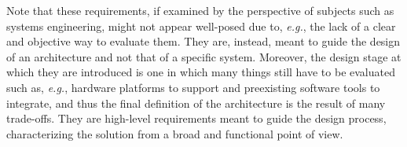 Note that these requirements, if examined by the perspective of subjects such as systems engineering, might not appear well-posed due to, \emph{e.g.}, the lack of a clear and objective way to evaluate them. They are, instead, meant to guide the design of an architecture and not that of a specific system. Moreover, the design stage at which they are introduced is one in which many things still have to be evaluated such as, \emph{e.g.}, hardware platforms to support and preexisting software tools to integrate, and thus the final definition of the architecture is the result of many trade-offs. They are high-level requirements meant to guide the design process, characterizing the solution from a broad and functional point of view.
